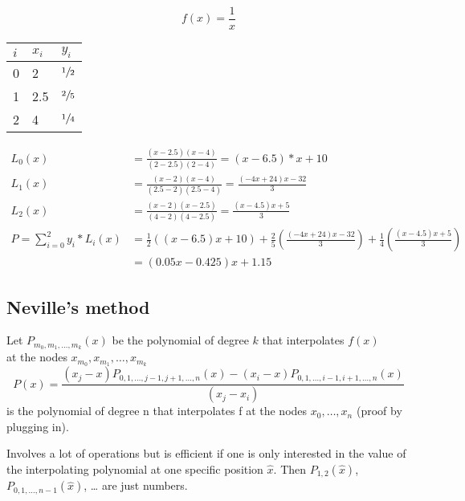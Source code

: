 \begin{example}
    \begin{equation*}
        f(x)= \frac{1}{x}
    \end{equation*}
    \begin{center}
        \begin{tabular}{l l l}
            \toprule
            $i$ & $x_i$ & $y_i$          \\
            \midrule
            0   & 2     & $\sfrac{1}{2}$ \\
            1   & 2.5   & $\sfrac{2}{5}$ \\
            2   & 4     & $\sfrac{1}{4}$ \\
            \bottomrule
        \end{tabular}
    \end{center}

    \begin{align*}
        L_0(x) &= \frac{(x-2.5)(x-4)}{(2-2.5)(2-4)}=(x-6.5)*x+10\\
        L_1(x) &= \frac{(x-2)(x-4)}{(2.5-2)(2.5-4)}=\frac{(-4x+24)x-32}{3}\\
        L_2(x) &= \frac{(x-2)(x-2.5)}{(4-2)(4-2.5)}= \frac{(x-4.5)x+5}{3}\\
        P=\sum_{i=0}^{2}y_i*L_i(x) &= \frac{1}{2}((x-6.5)x+10)+ \frac{2}{5}
        \left( \frac{(-4x+24)x-32}{3} \right)+\frac{1}{4}\left( \frac{(x-4.5)x+5}{3} \right)\\
        &=(0.05x-0.425)x+1.15
    \end{align*}
\end{example}

\subsection{Neville's method}\label{subsec:neville's-method}
Let $P_{m_0, m_1, \dots, m_k} (x)$ be the polynomial of degree $k$ that interpolates $f(x)$\\
at the nodes $x_{m_0}, x_{m_1},\ldots,x_{m_k}$
\begin{equation*}
    P(x)= \frac{(x_j-x)P_{0,1,\ldots, j-1, j+1, \ldots, n}(x)-(x_i-x)P_{0,1,\ldots, i-1, i+1, \ldots, n}(x)}{(x_j-x_i)}
\end{equation*}
is the polynomial of degree n that interpolates f at the nodes $x_0, \ldots, x_n$ (proof by plugging in).

Involves a lot of operations but is efficient if one is only interested in the value of the interpolating polynomial at one specific position $\hat{x}$.
Then $P_{1,2}(\hat{x})$, $P_{0,1,\ldots, n-1}(\hat{x})$, \ldots{} are just numbers.

